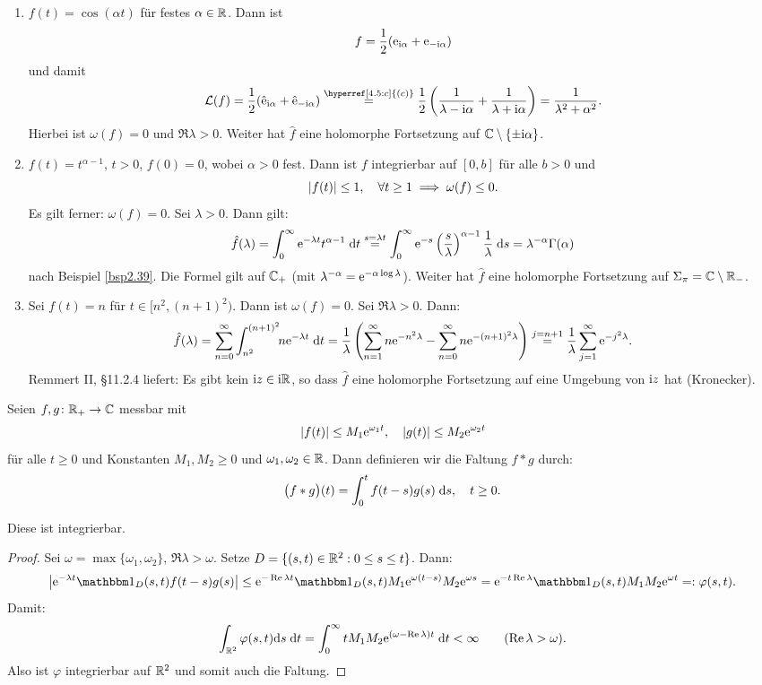 \documentclass[a4paper,twoside,DIV15,BCOR12mm]{scrbook}
\begin{document}
\begin{bsp}
\begin{enumerate}
\item $f(t) = \cos(\alpha t)$ für festes $\alpha\in\mathbb{R}$. Dann ist
\[f = \frac{1}{2}(\mathrm{e}_{\mathrm{i}\alpha}+\mathrm{e}_{-\mathrm{i}\alpha})\]
und damit
\[\L(f) = \frac{1}{2}(\hat{\e}_{\i\alpha} + \hat{\e}_{-\i\alpha})\overset{\hyperref[4.5:c]{(c)}}{=}\frac{1}{2}\left(\frac{1}{\lambda-\i\alpha}+\frac{1}{\lambda+\i\alpha}\right) = \frac{1}{\lambda^2+\alpha^2}.\]
Hierbei ist $\omega(f)=0$ und $\Re{\lambda}>0$. Weiter hat $\hat{f}$ eine holomorphe Fortsetzung auf $\mathbb{C}\setminus\{\pm\mathrm{i}\alpha\}$.

\item $f(t)=t^{\alpha-1}$, $t>0$, $f(0)=0$, wobei $\alpha>0$ fest. Dann ist $f$ integrierbar auf $[0,b]$ für alle $b>0$ und
\[\left\lvert f(t)\right\lvert\leq 1,\quad\forall t\geq 1\implies\omega(f)\leq 0.\]
Es gilt ferner: $\omega(f)=0$. Sei $\lambda>0$. Dann gilt:
\[\hat{f}(\lambda) = \int_{0}^{\infty}{\mathrm{e}^{-\lambda t}t^{\alpha-1}}\;\mathrm{d} t\overset{s=\lambda t}{=}\int_{0}^{\infty}{\mathrm{e}^{-s}\left(\frac{s}{\lambda}\right)^{\alpha-1}\frac{1}{\lambda}}\;\mathrm{d} s = \lambda^{-\alpha}\Gamma(\alpha)\]
nach Beispiel \ref{bsp2.39}. Die Formel gilt auf $\mathbb{C}_+$ (mit $\lambda^{-\alpha}=\mathrm{e}^{-\alpha\log\lambda}$). Weiter hat $\hat{f}$ eine holomorphe Fortsetzung auf $\Sigma_\pi=\mathbb{C}\setminus\mathbb{R}_-$.

\item Sei $f(t)=n$ für $t\in[n^2,(n+1)^2)$. Dann ist $\omega(f)=0$. Sei $\Re{\lambda}>0$. Dann:
\[\hat{f}(\lambda)=\sum_{n=0}^\infty\int_{n^2}^{(n+1)^2}{\!\!n\mathrm{e}^{-\lambda t}}\;\mathrm{d} t = \frac{1}{\lambda}\left(\sum_{n=1}^\infty n\mathrm{e}^{-n^2\lambda}-\sum_{n=0}^\infty n\mathrm{e}^{-(n+1)^2\lambda}\right)\overset{j=n+1}{=}\frac{1}{\lambda}\sum_{j=1}^\infty\mathrm{e}^{-j^2\lambda}.\]
Remmert II, §11.2.4 liefert: Es gibt kein $\mathrm{i} z\in\mathrm{i}\mathbb{R}$, so dass $\hat{f}$ eine holomorphe Fortsetzung auf eine Umgebung von $\mathrm{i} z$ hat (Kronecker).
\end{enumerate}\end{bsp}


Seien $f,g\colon\mathbb{R}_+\to\mathbb{C}$ messbar mit
\[\left\lvert f(t)\right\lvert\leq M_1\mathrm{e}^{\omega_1 t},\quad\left\lvert g(t)\right\lvert\leq M_2\mathrm{e}^{\omega_2 t}\]
für alle $t\geq 0$ und Konstanten $M_1,M_2\geq 0$ und $\omega_1,\omega_2\in\mathbb{R}$. Dann definieren wir die Faltung $f*g$ durch:
\[\bigl(f*g\bigr)(t) = \int_{0}^{t}{f(t-s)g(s)}\;\mathrm{d} s,\quad t\geq 0.\]

Diese ist integrierbar.
\begin{proof}
Sei $\omega=\max\{\omega_1,\omega_2\}$, $\Re{\lambda}>\omega$. Setze $D=\{(s,t)\in\mathbb{R}^2: 0\leq s\leq t\}$. Dann:
\[\abs{\e^{-\lambda t}\charfnkt{D}(s,t)f(t-s)g(s)}\leq\e^{-\Re{\lambda t}}\charfnkt{D}(s,t)M_1\e^{\omega(t-s)}M_2\e^{\omega s} = \e^{-t\Re{\lambda}}\charfnkt{D}(s,t)M_1M_2\e^{\omega t}\ad\varphi(s,t).\]
Damit:
\[\int_{\mathbb{R}^2}^{}{\varphi(s,t)\mathrm{d} s}\;\mathrm{d} t=\int_{0}^{\infty}{tM_1M_2\mathrm{e}^{(\omega-\operatorname{Re}{\lambda})t}}\;\mathrm{d} t<\infty\qquad(\operatorname{Re}{\lambda}>\omega).\]
Also ist $\varphi$ integrierbar auf $\mathbb{R}^2$ und somit auch die Faltung.
\end{proof}
\end{document}
